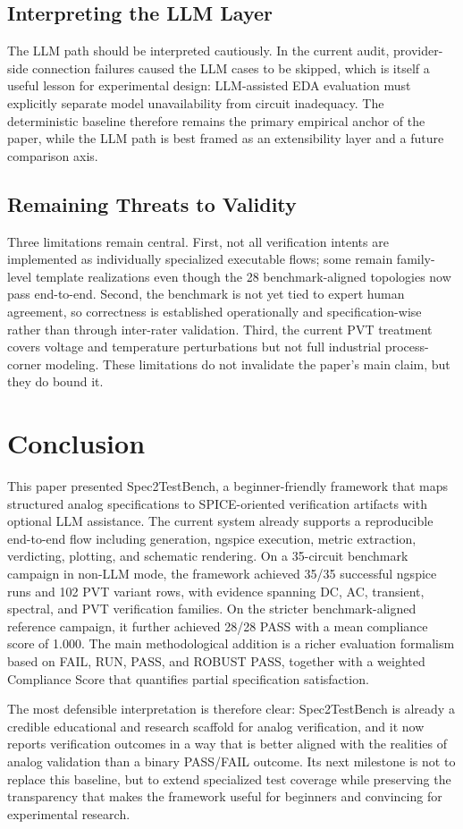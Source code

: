 \documentclass[conference]{IEEEtran}
\begin{document}
\subsection{Interpreting the LLM Layer}
The LLM path should be interpreted cautiously. In the current audit, provider-side connection failures caused the LLM cases to be skipped, which is itself a useful lesson for experimental design: LLM-assisted EDA evaluation must explicitly separate model unavailability from circuit inadequacy. The deterministic baseline therefore remains the primary empirical anchor of the paper, while the LLM path is best framed as an extensibility layer and a future comparison axis.

\subsection{Remaining Threats to Validity}
Three limitations remain central. First, not all verification intents are implemented as individually specialized executable flows; some remain family-level template realizations even though the 28 benchmark-aligned topologies now pass end-to-end. Second, the benchmark is not yet tied to expert human agreement, so correctness is established operationally and specification-wise rather than through inter-rater validation. Third, the current PVT treatment covers voltage and temperature perturbations but not full industrial process-corner modeling. These limitations do not invalidate the paper's main claim, but they do bound it.

\section{Conclusion}
This paper presented Spec2TestBench, a beginner-friendly framework that maps structured analog specifications to SPICE-oriented verification artifacts with optional LLM assistance. The current system already supports a reproducible end-to-end flow including generation, ngspice execution, metric extraction, verdicting, plotting, and schematic rendering. On a 35-circuit benchmark campaign in non-LLM mode, the framework achieved 35/35 successful ngspice runs and 102 PVT variant rows, with evidence spanning DC, AC, transient, spectral, and PVT verification families. On the stricter benchmark-aligned reference campaign, it further achieved 28/28 PASS with a mean compliance score of 1.000. The main methodological addition is a richer evaluation formalism based on FAIL, RUN, PASS, and ROBUST PASS, together with a weighted Compliance Score that quantifies partial specification satisfaction.

The most defensible interpretation is therefore clear: Spec2TestBench is already a credible educational and research scaffold for analog verification, and it now reports verification outcomes in a way that is better aligned with the realities of analog validation than a binary PASS/FAIL outcome. Its next milestone is not to replace this baseline, but to extend specialized test coverage while preserving the transparency that makes the framework useful for beginners and convincing for experimental research.

\balance


\end{document}

